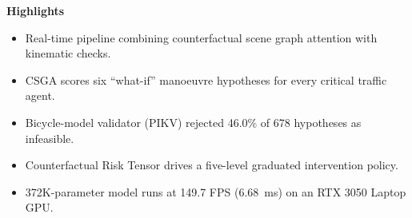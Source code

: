 \documentclass[preprint,12pt]{elsarticle}
\begin{document}
\textbf{Highlights}
\begin{itemize}
     \item Real-time pipeline combining counterfactual scene graph attention with kinematic checks.
     \item CSGA scores six ``what-if'' manoeuvre hypotheses for every critical traffic agent.
     \item Bicycle-model validator (PIKV) rejected 46.0\% of 678 hypotheses as infeasible.
     \item Counterfactual Risk Tensor drives a five-level graduated intervention policy.
     \item 372K-parameter model runs at 149.7 FPS (6.68~ms) on an RTX 3050 Laptop GPU.
\end{itemize}
\end{document}
